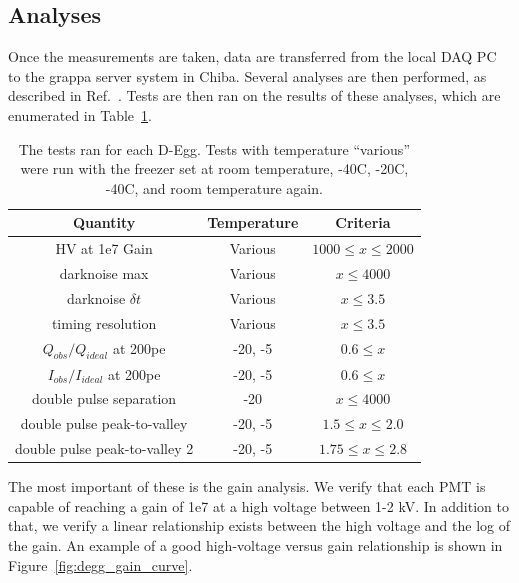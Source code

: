 \documentclass[main.tex]{subfiles}
\begin{document}
\subsection{Analyses}

Once the measurements are taken, data are transferred from the local DAQ PC to the grappa server system in Chiba. Several analyses are then performed, as described in Ref.~\cite{degg}. 
Tests are then ran on the results of these analyses, which are enumerated in Table~\ref{table:degg_tests}. 

\begin{table}
    \centering
    \begin{tabular}{c|cc}\rowcolor{blue!25}
        Quantity & Temperature & Criteria\\\hline
        HV at 1e7 Gain & Various & $1000\leq x \leq 2000$ \\
        darknoise max & Various & $x \leq 4000$ \\
        darknoise $\delta t$ & Various & $x \leq 3.5$ \\        
        timing resolution & Various & $x \leq 3.5$ \\
        $Q_{obs}/Q_{ideal}$ at 200pe & -20, -5 & $0.6\leq x$ \\
        $I_{obs}/I_{ideal}$ at 200pe & -20, -5 & $0.6\leq x$ \\
        double pulse separation & -20 & $x \leq 4000$ \\
        double pulse peak-to-valley & -20, -5 & $1.5\leq x\leq 2.0$ \\
        double pulse peak-to-valley 2 & -20, -5 & $1.75\leq x\leq 2.8$ \\
    \end{tabular}
    \caption{The tests ran for each D-Egg. Tests with temperature ``various'' were run with the freezer set at room temperature, -40C, -20C, -40C, and room temperature again. }\label{table:degg_tests}
\end{table}

The most important of these is the gain analysis. 
We verify that each PMT is capable of reaching a gain of 1e7 at a high voltage between 1-2 kV. 
In addition to that, we verify a linear relationship exists between the high voltage and the log of the gain. 
An example of a good high-voltage versus gain relationship is shown in Figure~\ref{fig:degg_gain_curve}.
\end{document}
